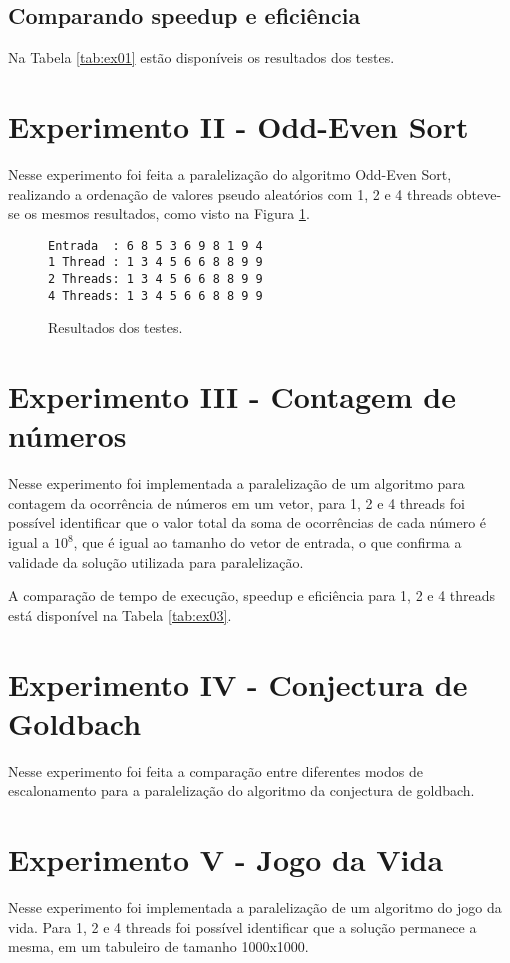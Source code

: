 \documentclass[conference]{IEEEtran}
\begin{document}
\subsection{Comparando speedup e eficiência}
Na Tabela \ref{tab:ex01} estão disponíveis os resultados dos testes.
\section{Experimento II - Odd-Even Sort}
Nesse experimento foi feita a paralelização do algoritmo Odd-Even Sort, realizando a ordenação de valores pseudo aleatórios com 1, 2 e 4 threads obteve-se os mesmos resultados, como visto na Figura \ref{fig:ex02}.
\begin{figure}[htb!]
	\begin{adjustbox}{max width=\linewidth}
		\begin{BVerbatim}
Entrada  : 6 8 5 3 6 9 8 1 9 4
1 Thread : 1 3 4 5 6 6 8 8 9 9
2 Threads: 1 3 4 5 6 6 8 8 9 9
4 Threads: 1 3 4 5 6 6 8 8 9 9
		\end{BVerbatim}
	\end{adjustbox}
	\caption{Resultados dos testes.\label{fig:ex02}}
\end{figure}


\section{Experimento III - Contagem de números}
Nesse experimento foi implementada a paralelização de um algoritmo para contagem da ocorrência de números em um vetor, para 1, 2 e 4 threads foi possível identificar que o valor total da soma de ocorrências de cada número é igual a $10^8$, que é igual ao tamanho do vetor de entrada, o que confirma a validade da solução utilizada para paralelização.

A comparação de tempo de execução, speedup e eficiência para 1, 2 e 4 threads está disponível na Tabela \ref{tab:ex03}.

\section{Experimento IV - Conjectura de Goldbach}
Nesse experimento foi feita a comparação entre diferentes modos de escalonamento para a paralelização do algoritmo da conjectura de goldbach.



\section{Experimento V - Jogo da Vida}
Nesse experimento foi implementada a paralelização de um algoritmo do jogo da vida.
Para 1, 2 e 4 threads foi possível identificar que a solução permanece a mesma, em um tabuleiro de tamanho 1000x1000.




%
\end{document}
